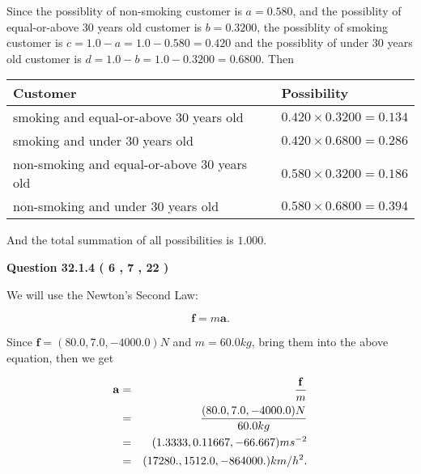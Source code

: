 \documentclass[12pt]{article}
\begin{document}
  
 
 

Since the possiblity of  %
 non-smoking customer is $ a =  %
0.580 $,
and the possiblity of  %
equal-or-above 30 years old customer is $ b =  %
0.3200 $,
the possiblity of  %
smoking customer is $ c = 1.0 - a = 1.0 -
0.580
=  %
0.420 $ and the possiblity of  %
under 30 years old
customer is $ d = 1.0 - b = 1.0 -  %
0.3200 =  %
0.6800  $.
Then
 
\noindent
\begin{tabular}{|l|l|}
\hline
Customer & Possibility \\
\hline
smoking  and  %
equal-or-above 30 years old  &
  $ %
0.420 \times  %
0.3200 =  %
0.134$ \\
\hline
smoking  and  %
under 30 years old &
  $ %
0.420 \times  %
0.6800 =  %
0.286$ \\
\hline
 non-smoking and  %
equal-or-above 30 years old  &
  $ %
0.580 \times  %
0.3200 =  %
0.186$ \\
\hline
 non-smoking and  %
under 30 years old &
  $ %
0.580 \times  %
0.6800 =  %
0.394$ \\
\hline
\end{tabular}
 
\noindent
And the total summation of all possibilities is $  %
1.000 $.
 
 
 
 
  
\vspace{0.2in}
  
{\textbf{\Large{Question
32.1.4 
 (           6 ,           7 ,          22 )
}}}
  
  
 
 

We will use the Newton's Second Law:
 
\[
\mathbf{f}=m\mathbf{a}.
\]
 
Since $\mathbf{f}=( %
80.0,  %
7.0,  %
-4000.0 )N$
and $m= %
60.0 kg$, bring them into the above equation, then we get
 
\begin{eqnarray*}
\mathbf{a}&=&\frac{\mathbf{f}}m  \\
&=&\frac{(
80.0 ,
7.0 ,
-4000.0 )N
}{ %
60.0 kg}  \\
&=&(
1.3333 ,
0.11667,
-66.667
)ms^{-2} \\
&=&(
17280. ,
1512.0 ,
-864000.
)km/h^2.
\end{eqnarray*}
 
 
 
\end{document}
